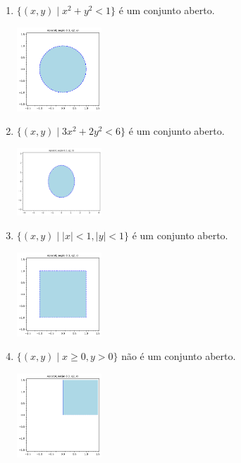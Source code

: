 \documentclass[../main.tex]{subfiles}
\begin{document}
		\begin{solucao}
			\begin{enumerate}[label=\alph*)]
				\item $\{(x,y) \mid x^2+y^2<1\}$ é um conjunto aberto.
				\begin{center}
					\includegraphics[width=0.25\textwidth]{imagens/lista03/picture_lista03.02_q01_item01.png}
				\end{center}
				\item $\{(x,y) \mid 3x^2+2y^2<6\}$ é um conjunto aberto.
				\begin{center}
					\includegraphics[width=0.25\textwidth]{imagens/lista03/picture_lista03.02_q01_item02.png}
				\end{center}
				\item $\{(x,y) \mid |x|<1, |y|<1\}$ é um conjunto aberto.
				\begin{center}
					\includegraphics[width=0.25\textwidth]{imagens/lista03/picture_lista03.02_q01_item03.png}
				\end{center}
				\item $\{(x,y) \mid x\geq0, y>0\}$ não é um conjunto aberto.
				\begin{center}
					\includegraphics[width=0.25\textwidth]{imagens/lista03/picture_lista03.02_q01_item04.png}

\end{center}
\end{enumerate}
\end{solucao}
\end{document}
